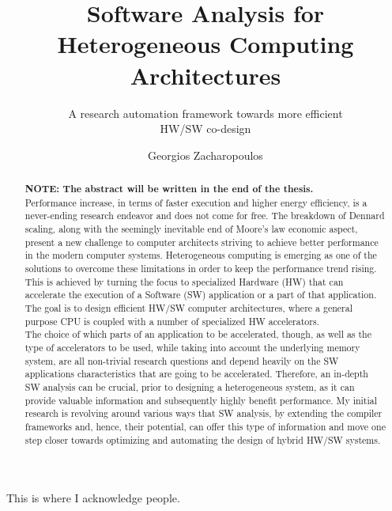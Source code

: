 \documentclass[]{usiinfthesis}
\title{Software Analysis for\\ Heterogeneous Computing Architectures} %
\subtitle{A research automation framework 
towards more efficient\\ HW/SW co-design} %
\author{Georgios Zacharopoulos} %
\begin{document}
\maketitle %

\frontmatter %

\begin{abstract}
\textbf{NOTE: The abstract will be written in the end of the thesis.}\\
Performance increase, in terms of faster execution and higher energy efficiency, 
is a never-ending research endeavor  %
and does not come for free.
The breakdown of Dennard scaling, along with the seemingly inevitable end of 
Moore's law economic aspect, present a new challenge to computer architects striving to achieve
better performance in the modern computer systems. Heterogeneous computing is 
emerging as one of the solutions to overcome these limitations in order to keep the performance 
trend rising. This is achieved by turning the focus to specialized Hardware (HW) that 
can accelerate the execution of a Software (SW) application or a part of that application.
The goal is to design efficient HW/SW computer architectures, where a general purpose CPU
is coupled with a number of specialized HW accelerators.\\
The choice of which parts of an application to be accelerated, though, as well as the type 
of accelerators to be used, while taking into account the underlying memory system, are all
non-trivial research questions and depend heavily on the SW applications characteristics that
are going to be accelerated. Therefore, an in-depth SW analysis can be crucial, prior to 
designing a heterogeneous system, as it can provide valuable information and subsequently 
highly benefit performance. My initial research is revolving around various ways that SW
analysis, by extending the compiler frameworks and, hence, their potential, can offer this 
type of information and move one step closer towards optimizing and automating the design of 
hybrid HW/SW systems.
\end{abstract}



\begin{acknowledgements}
This is where I acknowledge people.

\end{acknowledgements}
\end{document}
